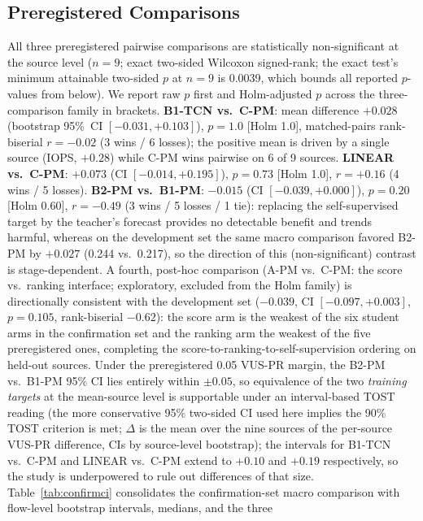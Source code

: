 \subsection{Preregistered Comparisons}\label{sec:confirm-comparisons}
All three preregistered pairwise comparisons are statistically
non-significant at the source level ($n{=}9$; exact two-sided
Wilcoxon signed-rank; the exact test's minimum attainable two-sided
$p$ at $n{=}9$ is 0.0039, which bounds all reported $p$-values from
below). We report raw $p$ first and Holm-adjusted $p$ across the
three-comparison family in brackets. \textbf{B1-TCN vs.\ C-PM}:
mean difference $+0.028$ (bootstrap 95\%~CI $[-0.031,+0.103]$),
$p{=}1.0$ [Holm 1.0], matched-pairs rank-biserial $r{=}-0.02$
(3 wins / 6 losses); the positive mean is driven by a
single source (IOPS, $+0.28$) while C-PM wins pairwise on 6 of 9
sources. \textbf{LINEAR vs.\ C-PM}: $+0.073$
(CI $[-0.014,+0.195]$), $p{=}0.73$ [Holm 1.0], $r{=}+0.16$
(4 wins / 5 losses). \textbf{B2-PM vs.\ B1-PM}: $-0.015$
(CI $[-0.039,+0.000]$), $p{=}0.20$ [Holm 0.60], $r{=}-0.49$
(3 wins / 5 losses / 1 tie): replacing the
self-supervised target by the teacher's forecast provides no detectable
benefit and trends harmful, whereas on the development set the same
macro comparison favored B2-PM by $+0.027$ (0.244 vs.\ 0.217), so the
direction of this (non-significant) contrast is stage-dependent.
A fourth, post-hoc comparison (A-PM vs.\ C-PM: the score vs.\ ranking
interface; exploratory, excluded from the Holm family) is directionally
consistent with the development set
($-0.039$, CI $[-0.097,+0.003]$, $p{=}0.105$, rank-biserial
$-0.62$): the score arm is the weakest of the six student arms in the
confirmation set and the ranking arm the weakest of the five
preregistered ones, completing the score-to-ranking-to-self-supervision
ordering on held-out sources.
Under the preregistered 0.05 VUS-PR margin, the
B2-PM vs.\ B1-PM 95\% CI lies entirely within $\pm0.05$, so
equivalence of the two \emph{training targets} at the mean-source
level is supportable under an interval-based TOST reading (the more
conservative 95\% two-sided CI used here implies the 90\% TOST
criterion is met; $\Delta$ is the mean over the nine sources of the
per-source VUS-PR difference, CIs by source-level bootstrap); the
intervals for
B1-TCN vs.\ C-PM and LINEAR vs.\ C-PM extend to $+0.10$ and $+0.19$
respectively, so the study is underpowered to rule out differences of
that size. Table~\ref{tab:confirmci} consolidates the confirmation-set macro
comparison with flow-level bootstrap intervals, medians, and the three
